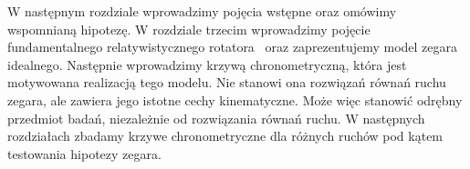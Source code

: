 W następnym rozdziale wprowadzimy pojęcia wstępne oraz omówimy
wspomnianą hipotezę. W rozdziale trzecim wprowadzimy pojęcie 
fundamentalnego relatywistycznego rotatora~\cite{star2008} oraz
zaprezentujemy model zegara idealnego. Następnie 
wprowadzimy krzywą chronometryczną, która jest motywowana 
realizacją tego modelu. Nie stanowi ona rozwiązań równań ruchu
zegara, ale zawiera jego istotne cechy kinematyczne.
Może więc stanowić odrębny przedmiot badań, niezależnie 
od rozwiązania równań ruchu.
W następnych rozdziałach zbadamy krzywe chronometryczne
dla różnych ruchów pod kątem testowania hipotezy zegara.
